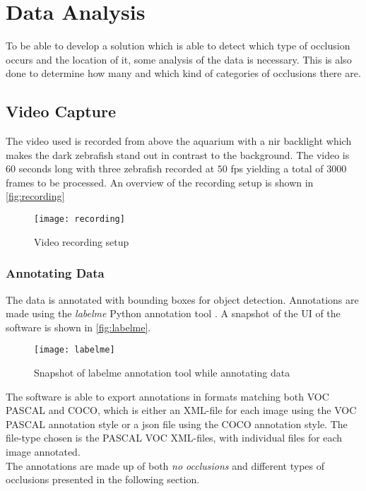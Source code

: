 \graphicspath{{figures/analysis/}}
\chapter{Data Analysis}\label{ch:data_anal}
To be able to develop a solution which is able to detect which type of occlusion occurs and the location of it, some analysis of the data is necessary. This is also done to determine how many and which kind of categories of occlusions there are.

\section{Video Capture}
The video used is recorded from above the aquarium with a \gls{nir} backlight which makes the dark zebrafish stand out in contrast to the background. The video is $ 60 $ seconds long with three zebrafish recorded at $ 50 $ \gls{fps} yielding a total of $3000$ frames to be processed. An overview of the recording setup is shown in \autoref{fig:recording}

\begin{figure}[H]
	\centering
	\texttt{[image: recording]}
	\caption{Video recording setup}
	\label{fig:recording}
\end{figure}

\subsection{Annotating Data}
The data is annotated with bounding boxes for object detection. Annotations are made using the \textit{labelme} Python annotation tool \citep{labelme2016}. A snapshot of the UI of the software is shown in \autoref{fig:labelme}.

\begin{figure}[H]
	\centering
	\texttt{[image: labelme]}
	\caption{Snapshot of labelme annotation tool while annotating data}
	\label{fig:labelme}
\end{figure}

The software is able to export annotations in formats matching both VOC PASCAL and COCO, which is either an XML-file for each image using the VOC PASCAL annotation style or a json file using the COCO annotation style. The file-type chosen is the PASCAL VOC XML-files, with individual files for each image annotated.\\

The annotations are made up of both \textit{no occlusions} and different types of occlusions presented in the following section.

